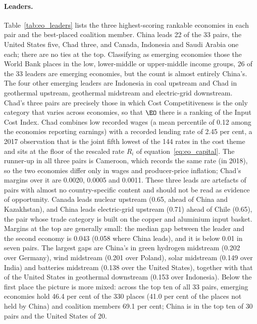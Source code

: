 \paragraph{Leaders.} Table~\ref{tab:eo_leaders} lists the three highest-scoring rankable economies
in each pair and the best-placed coalition member. China leads 22 of the 33 pairs, the United
States five, Chad three, and Canada, Indonesia and Saudi Arabia one each; there are no ties at the
top. Classifying as emerging economies those the World Bank places in the low, lower-middle or
upper-middle income groups, 26 of the 33 leaders are emerging economies, but the count is almost
entirely China's. The four other emerging leaders are Indonesia in coal upstream and Chad in
geothermal upstream, geothermal midstream and electric-grid downstream. Chad's three pairs are
precisely those in which Cost Competitiveness is the only category that varies across economies,
so that $\EO$ there is a ranking of the Input Cost Index. Chad combines low recorded wages (a mean
percentile of 0.12 among the economies reporting earnings) with a recorded lending rate of 2.45 per
cent, a 2017 observation that is the joint fifth lowest of the 144 rates in the cost theme and sits
at the floor of the rescaled rate $R_i$ of equation~\eqref{eq:eo_capital}. The runner-up in all
three pairs is Cameroon, which records the same rate (in 2018), so the two economies differ only in
wages and producer-price inflation; Chad's margins over it are 0.0020, 0.0005 and 0.0011. These
three leads are artefacts of pairs with almost no country-specific content and should not be read
as evidence of opportunity. Canada leads nuclear upstream (0.65, ahead of China and Kazakhstan),
and China leads electric-grid upstream (0.71) ahead of Chile (0.65), the pair whose trade category
is built on the copper and aluminium input basket. Margins at the top are generally small: the
median gap between the leader and the second economy is 0.043 (0.058 where China leads), and it is
below 0.01 in seven pairs. The largest gaps are China's in green hydrogen midstream (0.202 over
Germany), wind midstream (0.201 over Poland), solar midstream (0.149 over India) and batteries
midstream (0.138 over the United States), together with that of the United States in geothermal
downstream (0.153 over Indonesia). Below the first place the picture is more mixed: across the top
ten of all 33 pairs, emerging economies hold 46.4 per cent of the 330 places (41.0 per cent of the
places not held by China) and coalition members 69.1 per cent; China is in the top ten of 30 pairs
and the United States of 20.


